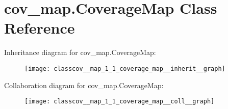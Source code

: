 \hypertarget{classcov__map_1_1_coverage_map}{}\section{cov\+\_\+map.\+Coverage\+Map Class Reference}
\label{classcov__map_1_1_coverage_map}


Inheritance diagram for cov\+\_\+map.\+Coverage\+Map\+:
\nopagebreak
\begin{figure}[H]
\begin{center}
\leavevmode
\texttt{[image: classcov\_\_map\_1\_1\_coverage\_map\_\_inherit\_\_graph]}
\end{center}
\end{figure}


Collaboration diagram for cov\+\_\+map.\+Coverage\+Map\+:
\nopagebreak
\begin{figure}[H]
\begin{center}
\leavevmode
\texttt{[image: classcov\_\_map\_1\_1\_coverage\_map\_\_coll\_\_graph]}
\end{center}
\end{figure}
